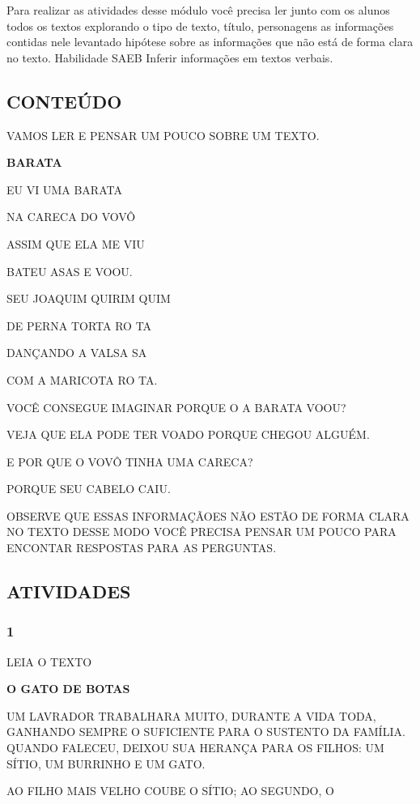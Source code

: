 Para realizar as atividades desse módulo você precisa ler junto com os
alunos todos os textos explorando o tipo de texto, título, personagens
as informações contidas nele levantado hipótese sobre as informações que
não está de forma clara no texto. Habilidade SAEB Inferir informações em
textos verbais.

\subsection{CONTEÚDO}\label{conteuxfado-5}

VAMOS LER E PENSAR UM POUCO SOBRE UM TEXTO.

\textbf{BARATA}

EU VI UMA BARATA

NA CARECA DO VOVÔ

ASSIM QUE ELA ME VIU

BATEU ASAS E VOOU.

SEU JOAQUIM QUIRIM QUIM

DE PERNA TORTA RO TA

DANÇANDO A VALSA SA

COM A MARICOTA RO TA.

VOCÊ CONSEGUE IMAGINAR PORQUE O A BARATA VOOU?

VEJA QUE ELA PODE TER VOADO PORQUE CHEGOU ALGUÉM.

E POR QUE O VOVÔ TINHA UMA CARECA?

PORQUE SEU CABELO CAIU.

OBSERVE QUE ESSAS INFORMAÇÃOES NÃO ESTÃO DE FORMA CLARA NO TEXTO DESSE
MODO VOCÊ PRECISA PENSAR UM POUCO PARA ENCONTAR RESPOSTAS PARA AS
PERGUNTAS.

\subsection{ATIVIDADES}\label{atividades-5}

\subsubsection{1}\label{section-68}

LEIA O TEXTO

\textbf{O GATO DE BOTAS}

UM LAVRADOR TRABALHARA MUITO, DURANTE A VIDA TODA, GANHANDO SEMPRE O
SUFICIENTE PARA O SUSTENTO DA FAMÍLIA. QUANDO FALECEU, DEIXOU SUA
HERANÇA PARA OS FILHOS: UM SÍTIO, UM BURRINHO E UM GATO.

AO FILHO MAIS VELHO COUBE O SÍTIO; AO SEGUNDO, O

